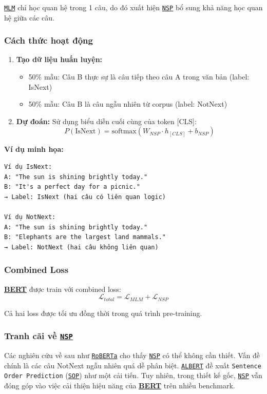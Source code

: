 \hyperref[acro:mlm]{\texttt{MLM}} chỉ học quan hệ trong 1 câu, do đó xuất hiện \hyperref[acro:nsp]{\texttt{NSP}} bổ sung khả năng học quan hệ giữa các câu.

\subsubsection{Cách thức hoạt động}
\begin{enumerate}
    \item \textbf{Tạo dữ liệu huấn luyện:}
    \begin{itemize}
        \item 50\% mẫu: Câu B thực sự là câu tiếp theo câu A trong văn bản (label: IsNext)
        \item 50\% mẫu: Câu B là câu ngẫu nhiên từ corpus (label: NotNext)
    \end{itemize}
    
    \item \textbf{Dự đoán:} Sử dụng biểu diễn cuối cùng của token [CLS]:
    \begin{equation}
    P(\text{IsNext}) = \text{softmax}(W_{NSP} \cdot h_{[CLS]} + b_{NSP})
    \label{eq:nsp_prediction}
    \end{equation}
\end{enumerate}

\textbf{Ví dụ minh họa:}
\begin{verbatim}
Ví dụ IsNext:
A: "The sun is shining brightly today."
B: "It's a perfect day for a picnic."
→ Label: IsNext (hai câu có liên quan logic)

Ví dụ NotNext:
A: "The sun is shining brightly today."
B: "Elephants are the largest land mammals."
→ Label: NotNext (hai câu không liên quan)
\end{verbatim}

\subsubsection{Combined Loss}
\hyperref[acro:bert]{\textbf{BERT}} được train với combined loss:
\begin{equation}
\mathcal{L}_{total} = \mathcal{L}_{MLM} + \mathcal{L}_{NSP}
\label{eq:combined_loss}
\end{equation}

Cả hai loss được tối ưu đồng thời trong quá trình pre-training.

\subsubsection{Tranh cãi về \hyperref[acro:nsp]{\texttt{NSP}}}
Các nghiên cứu về sau như \hyperref[acro:roberta]{\texttt{RoBERTa}} \cite{liu2019roberta} cho thấy \hyperref[acro:nsp]{\texttt{NSP}} có thể không cần thiết. Vấn đề chính là các câu NotNext ngẫu nhiên quá dễ phân biệt. \hyperref[acro:albert]{\texttt{ALBERT}} \cite{lan2019albert} đề xuất \texttt{Sentence Order Prediction} (\hyperref[acro:sop]{\texttt{SOP}}) như một cải tiến. Tuy nhiên, trong thiết kế gốc, \hyperref[acro:nsp]{\texttt{NSP}} vẫn đóng góp vào việc cải thiện hiệu năng của \hyperref[acro:bert]{\textbf{BERT}} trên nhiều benchmark.

